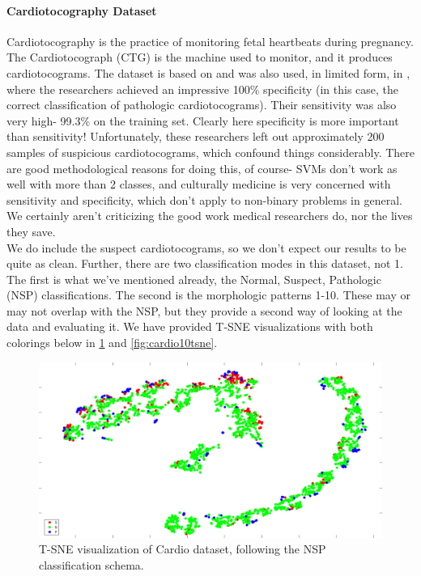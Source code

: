 \paragraph{Cardiotocography Dataset}
Cardiotocography is the practice of monitoring fetal heartbeats during pregnancy.  The Cardiotocograph (CTG) is the machine used to monitor, and it produces cardiotocograms.    The dataset is based on \cite{ayres-de-campos_sisporto_2000} and was also used, in limited form, in \cite{ocak_medical_2013}, where the researchers achieved an impressive 100\% specificity (in this case, the correct classification of pathologic cardiotocograms).  Their sensitivity was also very high- 99.3\% on the training set.  Clearly here specificity is more important than sensitivity!  Unfortunately, these researchers left out approximately 200 samples of suspicious cardiotocograms, which confound things considerably.  There are good methodological reasons for doing this, of course- SVMs don't work as well with more than 2 classes, and culturally medicine is very concerned with sensitivity and specificity, which don't apply to non-binary problems in general.  We certainly aren't criticizing the good work medical researchers do, nor the lives they save.\\
We do include the suspect cardiotocograms, so we don't expect our results to be quite as clean. Further, there are two classification modes in this dataset, not 1.  The first is what we've mentioned already, the Normal, Suspect, Pathologic (NSP) classifications.  The second is the morphologic patterns 1-10.  These may or may not overlap with the NSP, but they provide a second way of looking at the data and evaluating it.  We have provided T-SNE visualizations with both colorings below in \ref{fig:cardio3tsne} and \ref{fig:cardio10tsne}.
\begin{figure}
	\centering
	\includegraphics[width=0.9\linewidth]{figures/png/Cardio3TSNE}
	\caption[T-SNE visualization of Cardio dataset, NSP]{T-SNE visualization of Cardio dataset, following the NSP classification schema.}
	\label{fig:cardio3tsne}
\end{figure}
